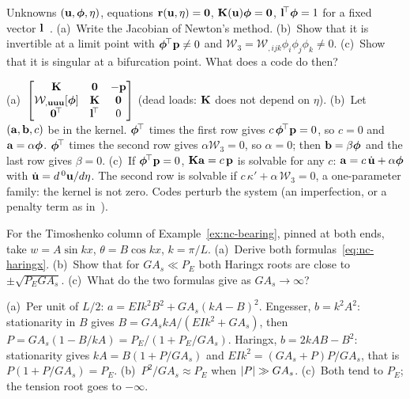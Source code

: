 \label{exo:nc-extended}
%
Unknowns $(\mathbf{u},\boldsymbol{\phi},\eta)$, equations $\mathbf{r}(\mathbf{u},\eta) = \mathbf{0}$,
$\mathbf{K}(\mathbf{u})\boldsymbol{\phi} = \mathbf{0}$, $\mathbf{l}^{\!\top}\boldsymbol{\phi} = 1$ for a fixed vector
$\mathbf{l}$~\cite{nc-wriggers1990}. (a)~Write the Jacobian of Newton's method. (b)~Show that it is
invertible at a limit point with $\boldsymbol{\phi}^{\!\top}\mathbf{p} \neq 0$ and
$\mathcal{W}_3 = \mathcal{W}_{,ijk}\phi_i\phi_j\phi_k \neq 0$. (c)~Show that it is singular at a
bifurcation point. What does a code do then?
\begin{solution}
(a)~$\begin{bmatrix} \mathbf{K} & \mathbf{0} & -\mathbf{p}\\ \mathcal{W}_{,\mathbf{u}\mathbf{u}\mathbf{u}}[\boldsymbol{\phi}] & \mathbf{K} & \mathbf{0}\\ \mathbf{0}^{\!\top} & \mathbf{l}^{\!\top} & 0\end{bmatrix}$
(dead loads: $\mathbf{K}$ does not depend on $\eta$). (b)~Let $(\mathbf{a},\mathbf{b},c)$ be in the kernel.
$\boldsymbol{\phi}^{\!\top}$ times the first row gives $c\,\boldsymbol{\phi}^{\!\top}\mathbf{p} = 0$, so $c = 0$ and $\mathbf{a} = \alpha\boldsymbol{\phi}$.
$\boldsymbol{\phi}^{\!\top}$ times the second row gives $\alpha\mathcal{W}_3 = 0$, so $\alpha = 0$; then
$\mathbf{b} = \beta\boldsymbol{\phi}$ and the last row gives $\beta = 0$. (c)~If $\boldsymbol{\phi}^{\!\top}\mathbf{p} = 0$,
$\mathbf{K}\mathbf{a} = c\,\mathbf{p}$ is solvable for any $c$: $\mathbf{a} = c\,\dot{\mathbf{u}} + \alpha\boldsymbol{\phi}$ with
$\dot{\mathbf{u}} = d\,{}^0\mathbf{u}/d\eta$. The second row is solvable if
$c\,\kappa' + \alpha\,\mathcal{W}_3 = 0$, a one-parameter family: the kernel is not zero. Codes
perturb the system (an imperfection, or a penalty term as in~\cite{nc-wriggers1990}).
\end{solution}

\label{exo:nc-haringx}
%
For the Timoshenko column of Example~\ref{ex:nc-bearing}, pinned at both ends, take
$w = A\sin kx$, $\theta = B\cos kx$, $k = \pi/L$. (a)~Derive both formulas~\eqref{eq:nc-haringx}.
(b)~Show that for $GA_s \ll P_E$ both Haringx roots are close to $\pm\sqrt{P_EGA_s}$.
(c)~What do the two formulas give as $GA_s \to \infty$?
\begin{solution}
(a)~Per unit of $L/2$: $a = EIk^2B^2 + GA_s(kA - B)^2$. Engesser, $b = k^2A^2$: stationarity in $B$
gives $B = GA_s kA/(EIk^2 + GA_s)$, then $P = GA_s(1 - B/kA) = P_E/(1 + P_E/GA_s)$.
Haringx, $b = 2kAB - B^2$: stationarity gives $kA = B(1 + P/GA_s)$ and
$EIk^2 = (GA_s + P)P/GA_s$, that is $P(1 + P/GA_s) = P_E$. (b)~$P^2/GA_s \approx P_E$ when
$\lvert P\rvert \gg GA_s$. (c)~Both tend to $P_E$; the tension root goes to $-\infty$.
\end{solution}

